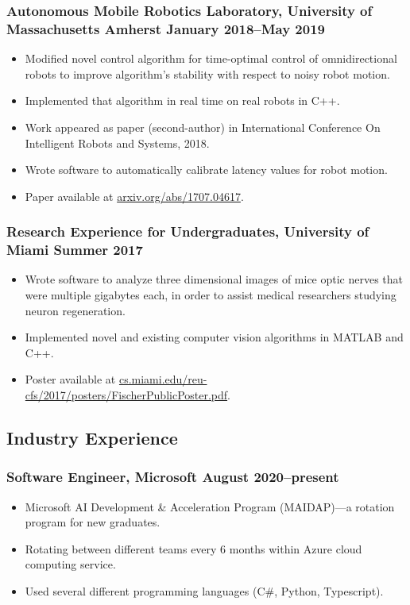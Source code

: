\documentclass{article}
\begin{document}
		\subsubsection*{Autonomous Mobile Robotics Laboratory, University of Massachusetts Amherst \hfill \normalfont \normalsize January 2018--May 2019}
			\begin{itemize}[noitemsep,leftmargin=40pt]
				\item Modified novel control algorithm for time-optimal control of omnidirectional robots to improve algorithm's stability with respect to noisy robot motion.
				\item Implemented that algorithm in real time on real robots in C++.
				\item Work appeared as paper (second-author) in International Conference On Intelligent Robots and Systems, 2018.
				\item Wrote software to automatically calibrate latency values for robot motion.
				\item Paper available at \href{https://arxiv.org/abs/1707.04617}{arxiv.org/abs/1707.04617}.
			\end{itemize}
		\subsubsection*{Research Experience for Undergraduates, University of Miami \hfill \normalfont \normalsize Summer 2017}
			\begin{itemize}[noitemsep,leftmargin=40pt]
				\item Wrote software to analyze three dimensional images of mice optic nerves that were multiple gigabytes each, in order to assist medical researchers studying neuron regeneration.
				\item Implemented novel and existing computer vision algorithms in MATLAB and C++.
				\item Poster available at \href{http://cs.miami.edu/reu-cfs/2017/posters/FischerPublicPoster.pdf}{cs.miami.edu/reu-cfs/2017/posters/FischerPublicPoster.pdf}.
			\end{itemize}
	
	\subsection*{Industry Experience}
		\subsubsection*{Software Engineer, Microsoft \hfill \normalfont \normalsize August 2020--present}
		\begin{itemize}[noitemsep,leftmargin=40pt]
			\item Microsoft AI Development \& Acceleration Program (MAIDAP)---a rotation program for new graduates.
			\item Rotating between different teams every 6 months within Azure cloud computing service.
			\item Used several different programming languages (C\#, Python, Typescript).
		\end{itemize}
\end{document}
